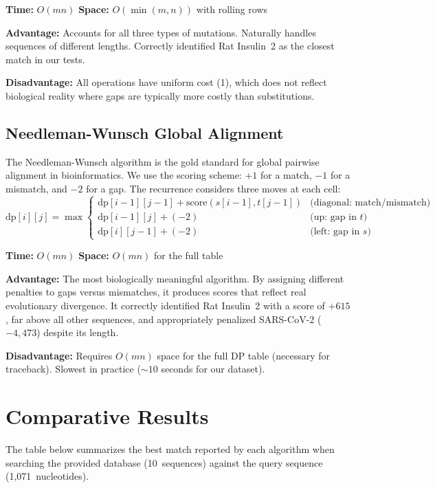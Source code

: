 \documentclass{article}
\begin{document}
\textbf{Time:} $O(mn)$ \quad \textbf{Space:} $O(\min(m, n))$ with rolling rows

\textbf{Advantage:} Accounts for all three types of mutations. Naturally handles sequences of different lengths. Correctly identified Rat Insulin~2 as the closest match in our tests.

\textbf{Disadvantage:} All operations have uniform cost (1), which does not reflect biological reality where gaps are typically more costly than substitutions.

\subsection{Needleman-Wunsch Global Alignment}

The Needleman-Wunsch algorithm is the gold standard for global pairwise alignment in bioinformatics. We use the scoring scheme: $+1$ for a match, $-1$ for a mismatch, and $-2$ for a gap. The recurrence considers three moves at each cell:
\[
\text{dp}[i][j] = \max
\begin{cases}
\text{dp}[i{-}1][j{-}1] + \text{score}(s[i{-}1], t[j{-}1]) & \text{(diagonal: match/mismatch)} \\
\text{dp}[i{-}1][j] + (-2) & \text{(up: gap in } t\text{)} \\
\text{dp}[i][j{-}1] + (-2) & \text{(left: gap in } s\text{)}
\end{cases}
\]

\textbf{Time:} $O(mn)$ \quad \textbf{Space:} $O(mn)$ for the full table

\textbf{Advantage:} The most biologically meaningful algorithm. By assigning different penalties to gaps versus mismatches, it produces scores that reflect real evolutionary divergence. It correctly identified Rat Insulin~2 with a score of $+615$, far above all other sequences, and appropriately penalized SARS-CoV-2 ($-4{,}473$) despite its length.

\textbf{Disadvantage:} Requires $O(mn)$ space for the full DP table (necessary for traceback). Slowest in practice (${\sim}10$ seconds for our dataset).

\section{Comparative Results}

The table below summarizes the best match reported by each algorithm when searching the provided database (10~sequences) against the query sequence (1,071~nucleotides).
\end{document}
